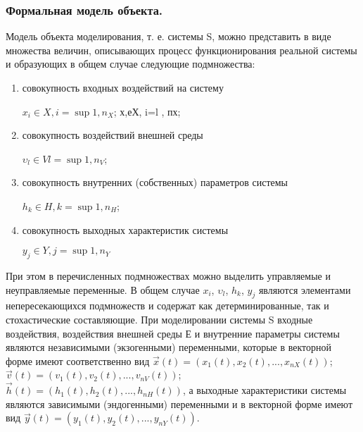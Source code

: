 \subsubsection{Формальная модель объекта.}

Модель объекта моделирования, т. е. системы S, можно представить в виде множества величин, описывающих процесс функционирования реальной системы и образующих в общем случае следующие подмножества:

\begin{enumerate}
  \item совокупность входных воздействий на систему
      \begin{center}
        $x_{i} \in X, i = \sup{1, n_{X}}$; х,еХ, i=l , пх;
      \end{center}

  \item совокупность воздействий внешней среды
     \begin{center}
       $\upsilon_{l} \in V l = \sup{1, n_{V}}$;
     \end{center}

  \item совокупность внутренних (собственных) параметров системы
     \begin{center}
       $h_{k} \in H, k = \sup{1, n_{H}}$;
     \end{center}

  \item совокупность выходных характеристик системы
    \begin{center}
      $y_{j} \in Y, j = \sup{1, n_{Y}}$
    \end{center}

\end{enumerate}

  При этом в перечисленных подмножествах можно выделить управляемые и неуправляемые переменные. В общем случае $x_{i}$, $\upsilon_{l}$, $h_{k}$, $y_{j}$ являются элементами непересекающихся подмножеств и содержат как детерминированные, так и стохастические составляющие. При моделировании системы S входные воздействия, воздействия внешней среды Е и внутренние параметры системы являются независимыми (экзогенными) переменными, которые в векторной форме имеют соответственно вид $\vec{x}(t) = (x_{1}(t), x_{2}(t), ..., x_{nX}(t))$; $\vec{v}(t) = (v_{1}(t), v_{2}(t), ... , v_{nV}(t))$; $\vec{h}(t) = (h_{1}(t), h_{2}(t), ... , h_{nH}(t))$, а выходные характеристики системы являются зависимыми (эндогенными) переменными и в векторной форме имеют вид $\vec{y}(t) = (y_{1}(t), y_{2}(t), ... , y_{nY}(t))$.

